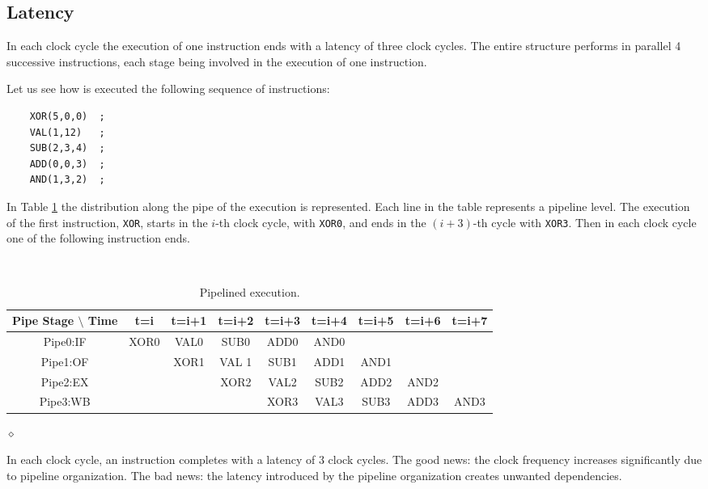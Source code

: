 \subsection{Latency}

In each clock cycle the execution of one instruction  ends with a latency of three clock cycles. The entire structure performs in parallel 4 successive instructions, each stage being involved in the execution of one instruction.

\begin{exemplu}
Let us see how is executed the following sequence of instructions:
\begin{verbatim}
    XOR(5,0,0)  ;
    VAL(1,12)   ;
    SUB(2,3,4)  ;
    ADD(0,0,3)  ;
    AND(1,3,2)  ;
\end{verbatim}
In Table \ref{pipeEx} the distribution along the pipe of the execution is represented. Each line in the table represents a pipeline level. The execution of the first instruction, {\tt XOR}, starts in the $i$-th clock cycle, with {\tt XOR0}, and ends in the $(i+3)$-th cycle with {\tt XOR3}. Then in each clock cycle one of the following instruction ends.

\begin{table}[H]
  \begin{center}
    \caption{Pipelined execution.}
    \label{pipeEx}
    {\small
    {\tt
    \begin{tabular}{|c||c|c|c|c|c|c|c|c|}
      \hline
     Pipe Stage $\setminus$ Time    & t=i & t=i+1 & t=i+2 & t=i+3 & t=i+4 & t=i+5 & t=i+6 & t=i+7   \\ \hline \hline
        Pipe0:IF        & XOR0 & VAL0   & SUB0   & ADD0   & AND0   &      &       &         \\ \hline
        Pipe1:OF        &     & XOR1   & VAL 1  & SUB1   & ADD1   & AND1   &          &         \\ \hline
        Pipe2:EX        &     &       & XOR2   & VAL2   & SUB2   & ADD2   & AND2   &        \\ \hline
        Pipe3:WB        &     &       &       & XOR3   & VAL3   & SUB3   & ADD3   & AND3        \\ \hline
    \end{tabular}
    }
    }
  \end{center}
\end{table}
$\diamond$
\end{exemplu}

In each clock cycle, an instruction completes with a latency of 3 clock cycles. The good news: the clock frequency increases significantly due to pipeline organization. The bad news: the latency introduced by the pipeline organization creates unwanted dependencies.

